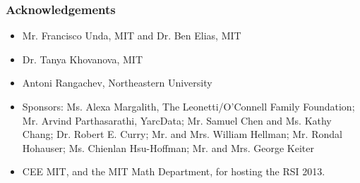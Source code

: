 \documentclass[pdf]{beamer}
\def\ii{\item}
\begin{document}
%
%
%

\begin{frame}
	\frametitle{Acknowledgements}
	\begin{itemize}
		\ii \alert{Mr. Francisco Unda}, MIT and \alert{Dr. Ben Elias}, MIT
		\ii \alert{Dr. Tanya Khovanova}, MIT
		\ii \alert{Antoni Rangachev}, Northeastern University
		\ii \alert{Sponsors}: Ms. Alexa Margalith, The Leonetti/O'Connell Family Foundation; Mr. Arvind Parthasarathi, YarcData; Mr. Samuel Chen and Ms. Kathy Chang; Dr. Robert E. Curry; Mr. and Mrs. William Hellman; Mr. Rondal Hohauser; Ms. Chienlan Hsu-Hoffman; Mr. and Mrs. George Keiter
		\ii \alert{CEE} \alert{MIT}, and the \alert{MIT Math Department}, for hosting the \alert{RSI 2013}.
	\end{itemize}
\end{frame}
\end{document}

